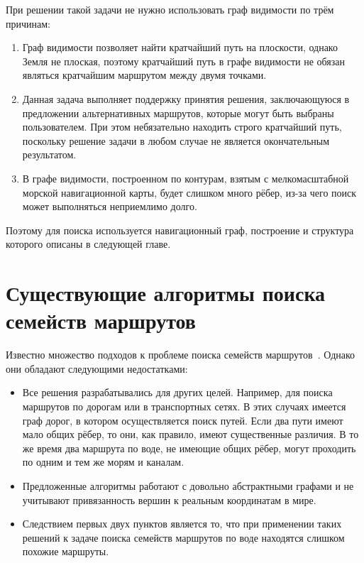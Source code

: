 При решении такой задачи не нужно использовать граф видимости по трём
причинам:
\begin{enumerate}
    \item Граф видимости позволяет найти кратчайший путь на плоскости,
      однако Земля не плоская, поэтому кратчайший путь в графе
      видимости не обязан являться кратчайшим маршрутом между двумя точками.
    \item Данная задача выполняет поддержку принятия решения,
      заключающуюся в предложении альтернативных маршрутов, которые
      могут быть выбраны пользователем. При этом небязательно находить
      строго кратчайший путь, поскольку решение задачи в любом случае
      не является окончательным результатом.
    \item В графе видимости, построенном по контурам, взятым с
      мелкомасштабной морской навигационной карты, будет слишком много
      рёбер, из-за чего поиск может выполняться неприемлимо долго.
\end{enumerate}
Поэтому для поиска используется навигационный граф, построение и
структура которого описаны в следующей главе.

\FloatBarrier

\section{Существующие алгоритмы поиска семейств маршрутов}

Известно множество подходов к проблеме поиска семейств
маршрутов~\cite{lim2005shortest, dial1971probabilistic, mafast}.
Однако они обладают следующими недостатками:
  
\begin{itemize}
    \item Все решения разрабатывались для других целей. Например, для
      поиска маршрутов по дорогам или в транспортных сетях. В этих
      случаях имеется граф дорог, в котором осуществляется поиск путей.
      Если два пути имеют мало общих рёбер, то они, как правило, имеют
      существенные различия. В то же время два маршрута по воде, не
      имеющие общих рёбер, могут проходить по одним и тем же морям и
      каналам.
    \item Предложенные алгоритмы работают с довольно абстрактными
      графами и не учитывают привязанность вершин к реальным координатам
      в мире.
    \item Следствием первых двух пунктов является то, что при
      применении таких решений к задаче поиска семейств маршрутов по
      воде находятся слишком похожие маршруты.
\end{itemize}

